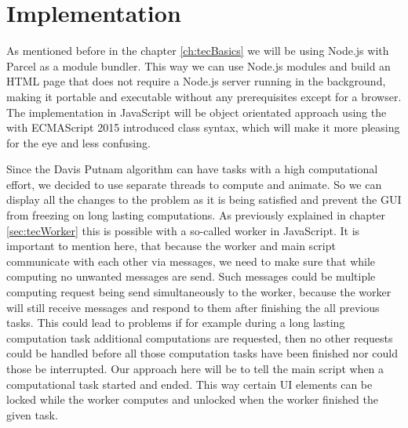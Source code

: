 
\chapter{Implementation}
\label{ch:implementation}
As mentioned before in the chapter \ref{ch:tecBasics} we will be using Node.js with Parcel as a module bundler. This way we can use Node.js modules and build an HTML page that does not require a Node.js server running in the background, making it portable and executable without any prerequisites except for a browser. The implementation in JavaScript will be object orientated approach using the with ECMAScript 2015 introduced class syntax, which will make it more pleasing for the eye and less confusing.

Since the Davis Putnam algorithm can have tasks with a high computational effort, we decided to use separate threads to compute and animate. So we can display all the changes to the problem as it is being satisfied and prevent the GUI from freezing on long lasting computations. As previously explained in chapter \ref{sec:tecWorker} this is possible with a so-called worker in JavaScript. It is important to mention here, that because the worker and main script communicate with each other via messages, we need to make sure that while computing no unwanted messages are send. Such messages could be multiple computing request being send simultaneously to the worker, because the worker will still receive messages and respond to them after finishing the all previous tasks. This could lead to problems if for example during a long lasting computation task additional computations are requested, then no other requests could be handled before all those computation tasks have been finished nor could those be interrupted. Our approach here will be to tell the main script when a computational task started and ended. This way certain UI elements can be locked while the worker computes and unlocked when the worker finished the given task.

